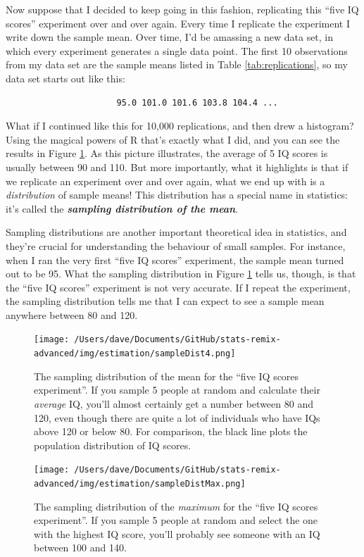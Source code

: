 \documentclass[
]{book}
\begin{document}
Now suppose that I decided to keep going in this fashion, replicating this ``five IQ scores'' experiment over and over again. Every time I replicate the experiment I write down the sample mean. Over time, I'd be amassing a new data set, in which every experiment generates a single data point. The first 10 observations from my data set are the sample means listed in Table \ref{tab:replications}, so my data set starts out like this:

\begin{verbatim}
                      95.0 101.0 101.6 103.8 104.4 ...
\end{verbatim}

What if I continued like this for 10,000 replications, and then drew a histogram? Using the magical powers of R that's exactly what I did, and you can see the results in Figure \ref{fig:sampdistmean}. As this picture illustrates, the average of 5 IQ scores is usually between 90 and 110. But more importantly, what it highlights is that if we replicate an experiment over and over again, what we end up with is a \emph{distribution} of sample means! This distribution has a special name in statistics: it's called the \textbf{\emph{sampling distribution of the mean}}.

Sampling distributions are another important theoretical idea in statistics, and they're crucial for understanding the behaviour of small samples. For instance, when I ran the very first ``five IQ scores'' experiment, the sample mean turned out to be 95. What the sampling distribution in Figure \ref{fig:sampdistmean} tells us, though, is that the ``five IQ scores'' experiment is not very accurate. If I repeat the experiment, the sampling distribution tells me that I can expect to see a sample mean anywhere between 80 and 120.

\begin{figure}
\centering
\texttt{[image: /Users/dave/Documents/GitHub/stats-remix-advanced/img/estimation/sampleDist4.png]}
\caption{\label{fig:sampdistmean}The sampling distribution of the mean for the ``five IQ scores experiment''. If you sample 5 people at random and calculate their \emph{average} IQ, you'll almost certainly get a number between 80 and 120, even though there are quite a lot of individuals who have IQs above 120 or below 80. For comparison, the black line plots the population distribution of IQ scores.}
\end{figure}

\begin{figure}
\centering
\texttt{[image: /Users/dave/Documents/GitHub/stats-remix-advanced/img/estimation/sampleDistMax.png]}
\caption{\label{fig:sampdistmax}The sampling distribution of the \emph{maximum} for the ``five IQ scores experiment''. If you sample 5 people at random and select the one with the highest IQ score, you'll probably see someone with an IQ between 100 and 140.}
\end{figure}
\end{document}
